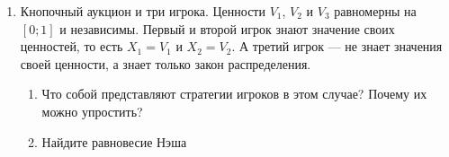 \begin{enumerate}
\item Кнопочный аукцион и три игрока. Ценности $ V_{1} $, $ V_{2} $ и $ V_{3} $ равномерны на $ [0;1] $ и независимы. Первый и второй игрок знают значение своих ценностей, то есть $ X_{1}=V_{1} $ и $ X_{2}=V_{2} $. А третий игрок — не знает значения своей ценности, а знает только закон распределения.
\begin{enumerate}
\item Что собой представляют стратегии игроков в этом случае? Почему их можно упростить?
\item Найдите равновесие Нэша
\end{enumerate}


\end{enumerate}
